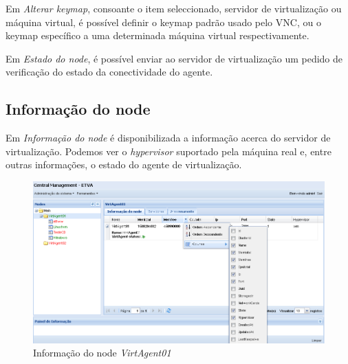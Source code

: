 Em \emph{Alterar keymap}, consoante o item seleccionado, servidor de virtualização ou máquina virtual, é possível definir o keymap padrão usado pelo VNC, ou o keymap específico a uma determinada máquina virtual respectivamente.

Em \emph{Estado do node}, é possível enviar ao servidor de virtualização um pedido de verificação do estado da conectividade do agente.

\subsection{Informação do node}
\label{sec:nodeinfo}
Em \emph{Informação do node} é disponibilizada a informação acerca do servidor de virtualização. Podemos ver o \emph{hypervisor} suportado pela máquina real e, entre outras informações, o estado do agente de virtualização.

\begin{figure}[H]
	\begin{center}
	\includegraphics[scale=0.45]{screenshots/node_info.png}
	\caption{Informação do node \emph{VirtAgent01}}
	\label{fig:node_info}
	\end{center}
\end{figure}

